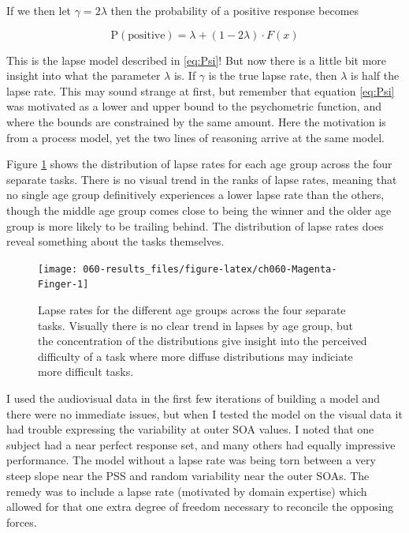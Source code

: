 \documentclass[11pt, oneside, openany]{scrbook}
\begin{document}
If we then let \(\gamma = 2\lambda\) then the probability of a positive response becomes

\[
\mathrm{P}(\textrm{positive}) = \lambda + (1 - 2\lambda) \cdot F(x)
\]

This is the lapse model described in \eqref{eq:Psi}! But now there is a little bit more insight into what the parameter \(\lambda\) is. If \(\gamma\) is the true lapse rate, then \(\lambda\) is half the lapse rate. This may sound strange at first, but remember that equation \eqref{eq:Psi} was motivated as a lower and upper bound to the psychometric function, and where the bounds are constrained by the same amount. Here the motivation is from a process model, yet the two lines of reasoning arrive at the same model.

Figure \ref{fig:ch060-Magenta-Finger} shows the distribution of lapse rates for each age group across the four separate tasks. There is no visual trend in the ranks of lapse rates, meaning that no single age group definitively experiences a lower lapse rate than the others, though the middle age group comes close to being the winner and the older age group is more likely to be trailing behind. The distribution of lapse rates does reveal something about the tasks themselves.

\begin{figure}

{\centering \texttt{[image: 060-results\_files/figure-latex/ch060-Magenta-Finger-1]} 

}

\caption{Lapse rates for the different age groups across the four separate tasks. Visually there is no clear trend in lapses by age group, but the concentration of the distributions give insight into the perceived difficulty of a task where more diffuse distributions may indiciate more difficult tasks.}\label{fig:ch060-Magenta-Finger}
\end{figure}

I used the audiovisual data in the first few iterations of building a model and there were no immediate issues, but when I tested the model on the visual data it had trouble expressing the variability at outer SOA values. I noted that one subject had a near perfect response set, and many others had equally impressive performance. The model without a lapse rate was being torn between a very steep slope near the PSS and random variability near the outer SOAs. The remedy was to include a lapse rate (motivated by domain expertise) which allowed for that one extra degree of freedom necessary to reconcile the opposing forces.
\end{document}
